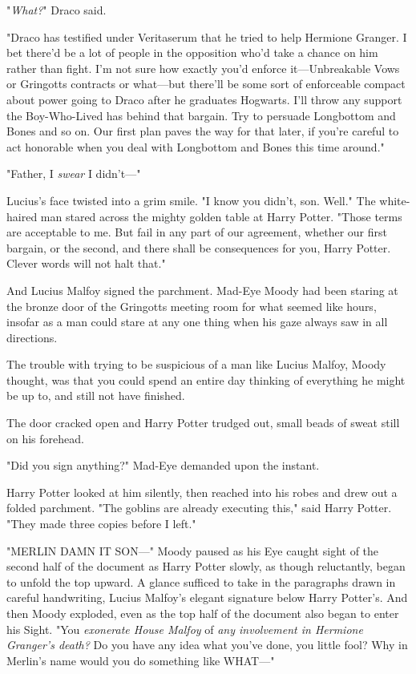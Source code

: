 "\emph{What?}" Draco said.

"Draco has testified under Veritaserum that he tried to help Hermione Granger.
I bet there'd be a lot of people in the opposition who'd take a chance on him
rather than fight. I'm not sure how exactly you'd enforce it---Unbreakable Vows
or Gringotts contracts or what---but there'll be some sort of enforceable
compact about power going to Draco after he graduates Hogwarts. I'll throw any
support the Boy-Who-Lived has behind that bargain. Try to persuade Longbottom
and Bones and so on. Our first plan paves the way for that later, if you're
careful to act honorable when you deal with Longbottom and Bones this time
around."

"Father, I \emph{swear} I didn't\mbox{---}"

Lucius's face twisted into a grim smile. "I know you didn't, son. Well." The
white-haired man stared across the mighty golden table at Harry Potter. "Those
terms are acceptable to me. But fail in any part of our agreement, whether our
first bargain, or the second, and there shall be consequences for you, Harry
Potter. Clever words will not halt that."

And Lucius Malfoy signed the parchment.
\sbreak
Mad-Eye Moody had been staring at the bronze door of the Gringotts meeting room
for what seemed like hours, insofar as a man could stare at any one thing when
his gaze always saw in all directions.

The trouble with trying to be suspicious of a man like Lucius Malfoy, Moody
thought, was that you could spend an entire day thinking of everything he might
be up to, and still not have finished.

The door cracked open and Harry Potter trudged out, small beads of sweat still
on his forehead.

"Did you sign anything?" Mad-Eye demanded upon the instant.

Harry Potter looked at him silently, then reached into his robes and drew out a
folded parchment. "The goblins are already executing this," said Harry Potter.
"They made three copies before I left."

"MERLIN DAMN IT SON\mbox{---}" Moody paused as his Eye caught sight of the second half
of the document as Harry Potter slowly, as though reluctantly, began to unfold
the top upward. A glance sufficed to take in the paragraphs drawn in careful
handwriting, Lucius Malfoy's elegant signature below Harry Potter's. And then
Moody exploded, even as the top half of the document also began to enter his
Sight. "You \emph{exonerate House Malfoy} of \emph{any involvement in Hermione
Granger's death?} Do you have any idea what you've done, you little fool? Why
in Merlin's name would you do something like WHAT\mbox{---}"
